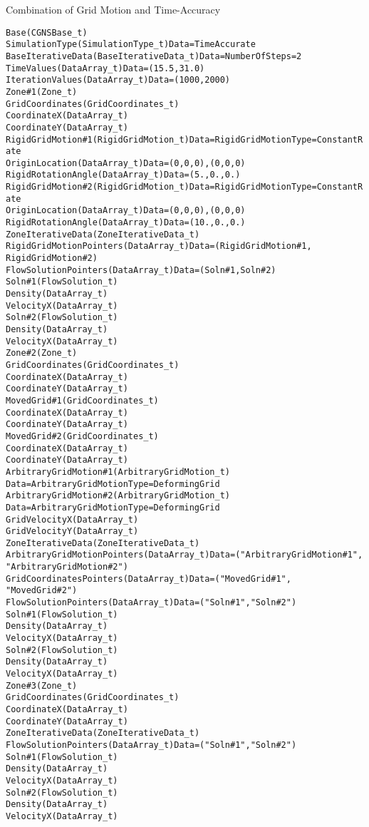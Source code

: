 \begin{example}{Combination of Grid Motion and Time-Accuracy}
\begin{alltt}
  Base (CGNSBase\_t)
    SimulationType (SimulationType\_t) Data=TimeAccurate
    BaseIterativeData (BaseIterativeData\_t) Data=NumberOfSteps=2
      TimeValues (DataArray\_t) Data=(15.5, 31.0)
      IterationValues (DataArray\_t) Data=(1000, 2000)
    Zone\#1 (Zone\_t)
      GridCoordinates (GridCoordinates\_t)
        CoordinateX (DataArray\_t)
        CoordinateY (DataArray\_t)
      RigidGridMotion\#1(RigidGridMotion\_t) Data=RigidGridMotionType=ConstantRate
        OriginLocation (DataArray\_t) Data=(0,0,0), (0,0,0)
        RigidRotationAngle (DataArray\_t) Data=(5., 0., 0.)
      RigidGridMotion\#2(RigidGridMotion\_t) Data=RigidGridMotionType=ConstantRate
        OriginLocation (DataArray\_t) Data=(0,0,0), (0,0,0)
        RigidRotationAngle (DataArray\_t) Data=(10., 0., 0.)
      ZoneIterativeData (ZoneIterativeData\_t)
        RigidGridMotionPointers (DataArray\_t) Data=(RigidGridMotion\#1,
                                                    RigidGridMotion\#2)
        FlowSolutionPointers (DataArray\_t) Data=(Soln\#1, Soln\#2)
      Soln\#1 (FlowSolution\_t)
        Density (DataArray\_t)
        VelocityX (DataArray\_t)
      Soln\#2 (FlowSolution\_t)
        Density (DataArray\_t)
        VelocityX (DataArray\_t)
    Zone\#2 (Zone\_t)
      GridCoordinates (GridCoordinates\_t)
        CoordinateX (DataArray\_t)
        CoordinateY (DataArray\_t)
      MovedGrid\#1 (GridCoordinates\_t)
        CoordinateX (DataArray\_t)
        CoordinateY (DataArray\_t)
      MovedGrid\#2 (GridCoordinates\_t)
        CoordinateX (DataArray\_t)
        CoordinateY (DataArray\_t)
      ArbitraryGridMotion\#1 (ArbitraryGridMotion\_t)
                             Data=ArbitraryGridMotionType=DeformingGrid
      ArbitraryGridMotion\#2 (ArbitraryGridMotion\_t)
                             Data=ArbitraryGridMotionType=DeformingGrid
        GridVelocityX (DataArray\_t)
        GridVelocityY (DataArray\_t)
      ZoneIterativeData (ZoneIterativeData\_t)
        ArbitraryGridMotionPointers (DataArray\_t) Data=("ArbitraryGridMotion\#1",
                                                        "ArbitraryGridMotion\#2")
        GridCoordinatesPointers (DataArray\_t) Data=("MovedGrid\#1",
                                                    "MovedGrid\#2")
        FlowSolutionPointers (DataArray\_t) Data=("Soln\#1", "Soln\#2")
      Soln\#1 (FlowSolution\_t)
        Density (DataArray\_t)
        VelocityX (DataArray\_t)
      Soln\#2 (FlowSolution\_t)
        Density (DataArray\_t)
        VelocityX (DataArray\_t)
    Zone\#3 (Zone\_t)
      GridCoordinates (GridCoordinates\_t)
        CoordinateX (DataArray\_t)
        CoordinateY (DataArray\_t)
      ZoneIterativeData (ZoneIterativeData\_t)
        FlowSolutionPointers (DataArray\_t) Data=("Soln\#1", "Soln\#2")
      Soln\#1 (FlowSolution\_t)
        Density (DataArray\_t)
        VelocityX (DataArray\_t)
      Soln\#2 (FlowSolution\_t)
        Density (DataArray\_t)
        VelocityX (DataArray\_t)
\end{alltt}


\end{example}
